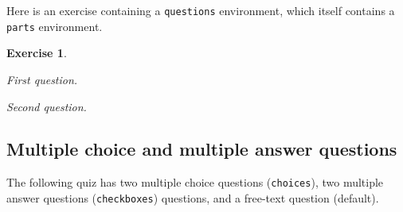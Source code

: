 \documentclass{article}
\theoremstyle{break}
\newcounter{theorem}
\newtheorem{exercise}[theorem]{Exercise}
\begin{document}
Here is an exercise containing a {\tt questions} environment, which itself contains a {\tt parts} environment. 
\begin{exercise}\label{exe:demo}
\begin{questions}
\question First question.
\question Second question.
\end{questions}
\end{exercise}

\subsection{Multiple choice and multiple answer questions}

The following quiz has two multiple choice questions (\texttt{choices}), two multiple answer questions (\texttt{checkboxes}) questions, and a free-text question (default).
\end{document}
